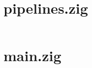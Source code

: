 \documentclass[a4paper,12pt]{report}
\begin{document}
\newpage
{}




\appendix

\renewcommand{\thechapter}{\arabic{chapter}}

\setcounter{chapter}{1}


\section{pipelines.zig}\label{appendix:pipelines_prototype}
\inputminted{zig}{../src/pipelines.zig}

\clearpage\section{main.zig}\label{appendix:parser_prototype}
\inputminted{zig}{../src/main.zig}
\end{document}
